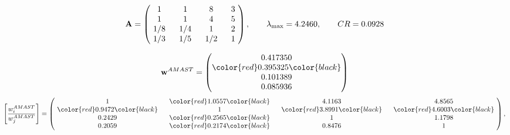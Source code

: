 \begin{example}
\begin{equation*}
\mathbf{A} =
\begin{pmatrix}
$\,\,$ 1 $\,\,$ & $\,\,$1$\,\,$ & $\,\,$8$\,\,$ & $\,\,$3 $\,\,$ \\
$\,\,$ 1 $\,\,$ & $\,\,$ 1 $\,\,$ & $\,\,$4$\,\,$ & $\,\,$5 $\,\,$ \\
$\,\,$ 1/8$\,\,$ & $\,\,$ 1/4$\,\,$ & $\,\,$ 1 $\,\,$ & $\,\,$2 $\,\,$ \\
$\,\,$ 1/3$\,\,$ & $\,\,$ 1/5$\,\,$ & $\,\,$ 1/2$\,\,$ & $\,\,$ 1  $\,\,$ \\
\end{pmatrix},
\qquad
\lambda_{\max} =
4.2460,
\qquad
CR = 0.0928
\end{equation*}

\begin{equation*}
\mathbf{w}^{AMAST} =
\begin{pmatrix}
0.417350\\
\color{red} 0.395325\color{black} \\
0.101389\\
0.085936
\end{pmatrix}\end{equation*}
\begin{equation*}
\left[ \frac{{w}^{AMAST}_i}{{w}^{AMAST}_j} \right] =
\begin{pmatrix}
$\,\,$ 1 $\,\,$ & $\,\,$\color{red} 1.0557\color{black} $\,\,$ & $\,\,$4.1163$\,\,$ & $\,\,$4.8565$\,\,$ \\
$\,\,$\color{red} 0.9472\color{black} $\,\,$ & $\,\,$ 1 $\,\,$ & $\,\,$\color{red} 3.8991\color{black} $\,\,$ & $\,\,$\color{red} 4.6003\color{black}   $\,\,$ \\
$\,\,$0.2429$\,\,$ & $\,\,$\color{red} 0.2565\color{black} $\,\,$ & $\,\,$ 1 $\,\,$ & $\,\,$1.1798 $\,\,$ \\
$\,\,$0.2059$\,\,$ & $\,\,$\color{red} 0.2174\color{black} $\,\,$ & $\,\,$0.8476$\,\,$ & $\,\,$ 1  $\,\,$ \\
\end{pmatrix},
\end{equation*}


\end{example}
